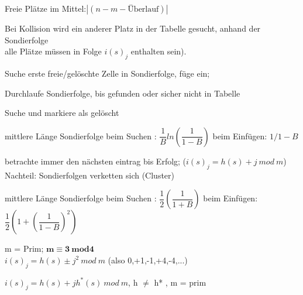 Freie Plätze im Mittel:$ |(n - m - \text{Überlauf}) |$


Bei Kollision wird ein anderer Platz in der Tabelle gesucht, anhand der Sondierfolge \\
alle Plätze müssen in Folge $i(s)_j$ enthalten sein).

Suche erste freie/gelöschte Zelle in Sondierfolge, füge ein;

Durchlaufe Sondierfolge, bis gefunden oder sicher nicht in Tabelle 

 Suche und markiere als gelöscht

mittlere Länge Sondierfolge beim Suchen : $\dfrac{1}{B}ln\left(\dfrac{1}{1-B}\right)$
beim Einfügen: $1/1-B$

betrachte immer den nächsten eintrag bis Erfolg; ($i(s)_j=h(s)+j~mod~m$)\\
Nachteil: Sondierfolgen verketten sich (Cluster)

mittlere Länge Sondierfolge beim Suchen : $\dfrac{1}{2}\left(\dfrac{1}{1+B}\right)$
beim Einfügen:  $\dfrac{1}{2}\left(1+\left(\dfrac{1}{1-B}\right)^2\right)$

m = Prim; $\mathbf{m \equiv 3 ~mod 4}$ \\
$i(s)_j = h(s) \pm j^2~mod~m$ (also 0,+1,-1,+4,-4,...) 

$i(s)_j = h(s) + jh^*(s)~ mod~ m$,  h $\neq$ h* , m = prim

